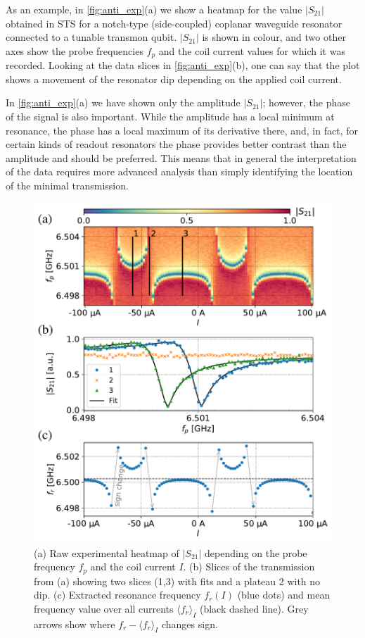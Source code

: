 \documentclass[%
 aip,
 draft,
 amsmath,amssymb,
 reprint,%
]{revtex4-1}
\begin{document}
As an example, in \autoref{fig:anti_exp}(a) we show a heatmap for the value $|S_{21}|$ obtained in STS for a notch-type (side-coupled) coplanar waveguide resonator connected to a tunable transmon qubit. $|S_{21}|$ is shown in colour, and two other axes show the probe frequencies $f_p$ and the coil current values for which it was recorded. Looking at the data slices in \autoref{fig:anti_exp}(b), one can say that the plot shows a movement of the resonator dip depending on the applied coil current. 

In \autoref{fig:anti_exp}(a) we have shown only the amplitude $|S_{21}|$; however, the phase of the signal is also important. While the amplitude has a local minimum at resonance, the phase has a local maximum of its derivative there, and, in fact, for certain kinds of readout resonators the phase provides better contrast than the amplitude and should be preferred. This means that in general the interpretation of the data requires more advanced analysis than simply identifying the location of the minimal transmission.

\begin{figure}
\includegraphics[width=\linewidth]{anti_subplots}
\caption{(a) Raw experimental heatmap of $|S_{21}|$ depending on the probe frequency $f_p$ and the coil current $I$. (b) Slices of the transmission from (a) showing two slices (1,3) with fits and a plateau 2 with no dip. (c) Extracted resonance frequency $f_r(I)$ (blue dots) and mean frequency value over all currents $\langle f_r \rangle_{I}$ (black dashed line). Grey arrows show where $f_r - \langle f_r \rangle_{I}$ changes sign.}
\label{fig:anti_exp}
\end{figure}
\end{document}
